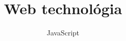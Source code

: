 \documentclass[usenames,dvipsnames,aspectratio=169]{beamer}
\title[Web technológiák - JavaScript]{Web technológia}
\subtitle{JavaScript}
\begin{document}
\begin{frame}[plain]
  \titlepage
  \logoalul
\end{frame}

%
%
%

\end{document}
